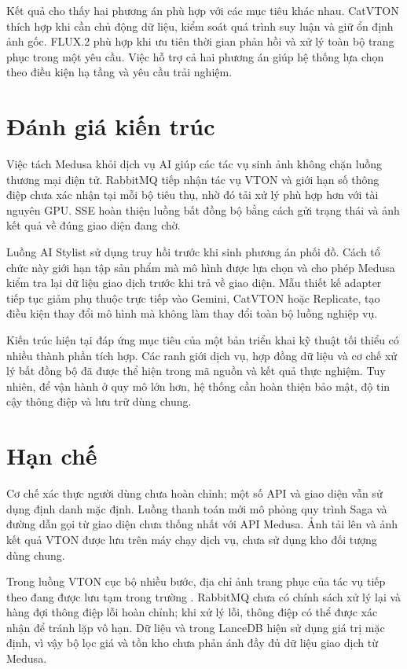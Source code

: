 \medskip

Kết quả cho thấy hai phương án phù hợp với các mục tiêu khác nhau. CatVTON thích hợp khi cần chủ động dữ liệu, kiểm soát quá trình suy luận và giữ ổn định ảnh gốc. FLUX.2 phù hợp khi ưu tiên thời gian phản hồi và xử lý toàn bộ trang phục trong một yêu cầu. Việc hỗ trợ cả hai phương án giúp hệ thống lựa chọn theo điều kiện hạ tầng và yêu cầu trải nghiệm.

\section{Đánh giá kiến trúc}

Việc tách Medusa khỏi dịch vụ AI giúp các tác vụ sinh ảnh không chặn luồng thương mại điện tử. RabbitMQ tiếp nhận tác vụ VTON và giới hạn số thông điệp chưa xác nhận tại mỗi bộ tiêu thụ, nhờ đó tải xử lý phù hợp hơn với tài nguyên GPU. SSE hoàn thiện luồng bất đồng bộ bằng cách gửi trạng thái và ảnh kết quả về đúng giao diện đang chờ.

\medskip

Luồng AI Stylist sử dụng truy hồi trước khi sinh phương án phối đồ. Cách tổ chức này giới hạn tập sản phẩm mà mô hình được lựa chọn và cho phép Medusa kiểm tra lại dữ liệu giao dịch trước khi trả về giao diện. Mẫu thiết kế adapter tiếp tục giảm phụ thuộc trực tiếp vào Gemini, CatVTON hoặc Replicate, tạo điều kiện thay đổi mô hình mà không làm thay đổi toàn bộ luồng nghiệp vụ.

\medskip

Kiến trúc hiện tại đáp ứng mục tiêu của một bản triển khai kỹ thuật tối thiểu có nhiều thành phần tích hợp. Các ranh giới dịch vụ, hợp đồng dữ liệu và cơ chế xử lý bất đồng bộ đã được thể hiện trong mã nguồn và kết quả thực nghiệm. Tuy nhiên, để vận hành ở quy mô lớn hơn, hệ thống cần hoàn thiện bảo mật, độ tin cậy thông điệp và lưu trữ dùng chung.

\section{Hạn chế}

Cơ chế xác thực người dùng chưa hoàn chỉnh; một số API và giao diện vẫn sử dụng định danh mặc định. Luồng thanh toán mới mô phỏng quy trình Saga và đường dẫn gọi từ giao diện chưa thống nhất với API Medusa. Ảnh tải lên và ảnh kết quả VTON được lưu trên máy chạy dịch vụ, chưa sử dụng kho đối tượng dùng chung.

\medskip

Trong luồng VTON cục bộ nhiều bước, địa chỉ ảnh trang phục của tác vụ tiếp theo đang được lưu tạm trong trường . RabbitMQ chưa có chính sách xử lý lại và hàng đợi thông điệp lỗi hoàn chỉnh; khi xử lý lỗi, thông điệp có thể được xác nhận để tránh lặp vô hạn. Dữ liệu  và  trong LanceDB hiện sử dụng giá trị mặc định, vì vậy bộ lọc giá và tồn kho chưa phản ánh đầy đủ dữ liệu giao dịch từ Medusa.

